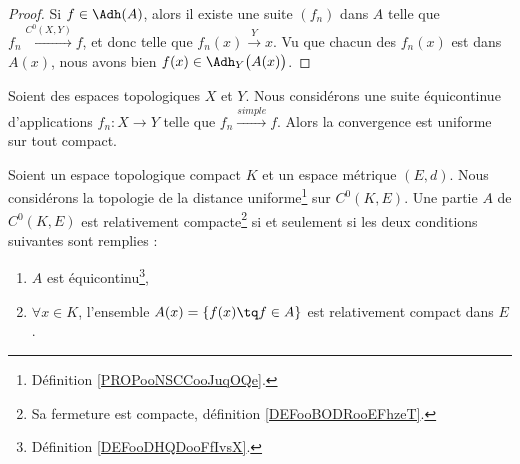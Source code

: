 \begin{proof}
	Si \( f\in \Adh(A)\), alors il existe une suite \( (f_n)\) dans \( A\) telle que \( f_n\stackrel{ C^0(X,Y)}{\longrightarrow} f\), et donc telle que \( f_n(x)\stackrel{ Y}{\longrightarrow} x\). Vu que chacun des \( f_n(x)\) est dans \( A(x)\), nous avons bien \( f(x)\in\Adh_Y\big( A(x) \big)\).
\end{proof}

\begin{proposition}	\label{PROPooCGBHooCpKycz}
	Soient des espaces topologiques \( X\) et \( Y\). Nous considérons une suite équicontinue d'applications \(f_n \colon X\to Y  \) telle que \( f_n\stackrel{ simple}{\longrightarrow} f\). Alors la convergence est uniforme sur tout compact.
\end{proposition}


\begin{theorem}        \label{ThoKRbtpah}
	Soient un espace topologique compact \( K\) et un espace métrique \( (E,d)\). Nous considérons la topologie de la distance uniforme\footnote{Définition \ref{PROPooNSCCooJuqOQe}.} sur \( C^0(K,E)\). Une partie \( A\) de \( C^0(K,E)\) est relativement compacte\footnote{Sa fermeture est compacte, définition \ref{DEFooBODRooEFhzeT}.} si et seulement si les deux conditions suivantes sont remplies :
	\begin{enumerate}
		\item
		      \( A\) est équicontinu\footnote{Définition \ref{DEFooDHQDooFfIvsX}.},
		\item
		      \( \forall x\in K\), l'ensemble \( A(x)= \{ f(x)\tq f\in A \}\) est relativement compact dans \( E\).
	\end{enumerate}
\end{theorem}


